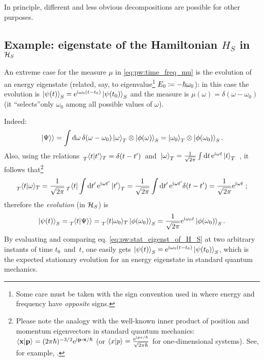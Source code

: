 In principle, different and less obvious decompositions are possible for other purposes.

\subsection{Example: eigenstate of the Hamiltonian $H_S$ in $\mathcal{H}_S$}\label{sec:pw:eeigenstate}

An extreme case for the measure $\mu$ in \eqref{eq:pw:time_freq_mu}
is the evolution of an energy eigenstate
(related, say, to eigenvalue\footnote{
  Some care must be taken with the sign convention used in
  \cite{Lloyd:Time} where
  energy and frequency have \emph{opposite} signs.
}
$E_0 \coloneqq -\hbar\omega_{0}$):
in this case the evolution is
$\ket{\psi(t)}_{S} = \mathrm{e}^{\mathrm{i}\mkern1mu\omega_{0}(t-t_{0})} \ket{\psi(t_0)}_{S}$
and
the measure is
$\mu(\omega) = \delta(\omega-\omega_0)$
(it  ``selects''only $\omega_0$ among all possible values
of $\omega$).

Indeed:
\[
  \left.\left| \Psi \right\rangle\right\rangle = \int \dd{\omega} \delta(\omega-\omega_0)\ket{\omega}_T \otimes \ket{\phi(\omega)}_S =
    \ket{\omega_0}_T \otimes \ket{\phi(\omega_0)}_S \text{.}
\]
Also, using the relations
$
\, \prescript{}{T}{\braket{t}{t'}}_T = \delta(t-t') \,
$
and
$
  \,
  \ket{\omega}_T =
  \frac{1}{\sqrt{2\pi}} \int\dd{t}\mathrm{e}^{\mathrm{i}\mkern1mu\omega t}\ket{t}_T
  \,
$
\parencite{Lloyd:Time},
it follows that\footnote{%
  Please note the analogy with the well-known
  inner product of position and momentum eigenvectors in standard quantum mechanics:
  $\braket{\vb{x}}{\vb{p}} = (2\pi\hbar)^{-3/2}\E^{\iu \vb{p} \vdot \vb{x}  / \hbar}$
  (or $\braket{x}{p} = \frac{\mathrm{e}^{\mathrm{i}\mkern1mu p x / \hbar}}{\sqrt{2\pi\hbar}}$ for one-dimensional systems).
  See, for example, \cite[126--127]{Ballentine}.
}
\[
  \prescript{}{T}{\braket{t}{\omega}}_T =
  \frac{1}{\sqrt{2\pi}}\prescript{}{T}{\bra{t}} \int\dd{t'}\mathrm{e}^{\mathrm{i}\mkern1mu\omega t'}\ket{t'}_T  =
  \frac{1}{\sqrt{2\pi}}\int\dd{t'}\mathrm{e}^{\mathrm{i}\mkern1mu\omega t'}\delta(t-t') =
  \frac{1}{\sqrt{2\pi}} \mathrm{e}^{\mathrm{i}\mkern1mu\omega t} \; \text{;}
\]
therefore the \emph{evolution} (in $\mathcal{H}_S$) is
\begin{equation}
  \ket{\psi(t)}_S = \prescript{}{T}{\!\left.\left\langle t \middle| \Psi \right\rangle\right\rangle} = \prescript{}{T}{\braket{t}{\omega_0}}_{T} \ket{\phi(\omega_0)}_S =
    \frac{1}{\sqrt{2\pi}} \mathrm{e}^{\mathrm{i}\mkern1mu\omega_0 t} \ket{\phi(\omega_0)}_S \text{.}
\label{eq:pw:stat_eigenst_of_H_S}
\end{equation}
By evaluating and comparing eq. \eqref{eq:pw:stat_eigenst_of_H_S} at two arbitrary instants of time
$t_0$~and~$t$,
one easily gets
$\ket{\psi(t)}_{S} = \mathrm{e}^{\mathrm{i}\mkern1mu\omega_{0}(t-t_{0})} \ket{\psi(t_0)}_{S}$,
which is the expected stationary evolution for an energy eigenstate in standard quantum mechanics. 






